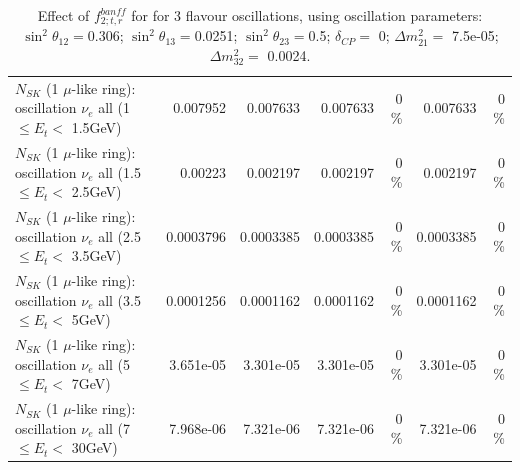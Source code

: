 \begin{table}
\begin{tabular}{| l | r | r | r  r | r  r |}
$N_{SK}$ (1 $\mu$-like ring): oscillation $\nu_{e}$ all (1 $\leq E_{t} <$ 1.5GeV) &        0.007952 &        0.007633 &        0.007633 &        0 \%  &        0.007633 &        0 \%  \\ 
$N_{SK}$ (1 $\mu$-like ring): oscillation $\nu_{e}$ all (1.5 $\leq E_{t} <$ 2.5GeV) &         0.00223 &        0.002197 &        0.002197 &        0 \%  &        0.002197 &        0 \%  \\ 
$N_{SK}$ (1 $\mu$-like ring): oscillation $\nu_{e}$ all (2.5 $\leq E_{t} <$ 3.5GeV) &       0.0003796 &       0.0003385 &       0.0003385 &        0 \%  &       0.0003385 &        0 \%  \\ 
$N_{SK}$ (1 $\mu$-like ring): oscillation $\nu_{e}$ all (3.5 $\leq E_{t} <$ 5GeV) &       0.0001256 &       0.0001162 &       0.0001162 &        0 \%  &       0.0001162 &        0 \%  \\ 
 $N_{SK}$ (1 $\mu$-like ring): oscillation $\nu_{e}$ all (5 $\leq E_{t} <$ 7GeV) &       3.651e-05 &       3.301e-05 &       3.301e-05 &        0 \%  &       3.301e-05 &        0 \%  \\ 
$N_{SK}$ (1 $\mu$-like ring): oscillation $\nu_{e}$ all (7 $\leq E_{t} <$ 30GeV) &       7.968e-06 &       7.321e-06 &       7.321e-06 &        0 \%  &       7.321e-06 &        0 \%  \\ 
\hline
\hline
\end{tabular}
\caption{ Effect of $f_{2; t, r}^{banff}$ for for 3 flavour oscillations, using oscillation parameters:  $\sin^2\theta_{12} = $0.306; $\sin^2\theta_{13} = $0.0251; $\sin^2\theta_{23} = $0.5; $\delta_{CP} = $        0; $\Delta m^2_{21} = $    7.5e-05; $\Delta m^2_{32} = $    0.0024. }
\label{tab:num_banff_02_1RmuT_3f_osc_t13:0.0251}
\end{table}
\clearpage
